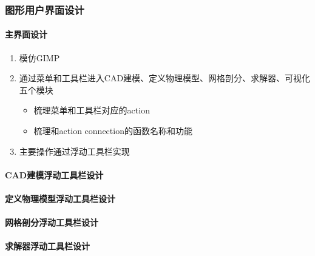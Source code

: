 \documentclass[letterpaper,10pt,english]{sphinxmanual}
\begin{document}
\subsubsection{图形用户界面设计}
\label{\detokenize{src/fengsim/airfoil:id2}}

\paragraph{主界面设计}
\label{\detokenize{src/fengsim/airfoil:id3}}\begin{enumerate}
%
\item {} 
\sphinxAtStartPar
模仿GIMP

\item {} 
\sphinxAtStartPar
通过菜单和工具栏进入CAD建模、定义物理模型、网格剖分、求解器、可视化五个模块
\begin{itemize}
\item {} 
\sphinxAtStartPar
梳理菜单和工具栏对应的action

\item {} 
\sphinxAtStartPar
梳理和action connection的函数名称和功能

\end{itemize}

\item {} 
\sphinxAtStartPar
主要操作通过浮动工具栏实现

\end{enumerate}


\paragraph{CAD建模浮动工具栏设计}
\label{\detokenize{src/fengsim/airfoil:cad}}

\paragraph{定义物理模型浮动工具栏设计}
\label{\detokenize{src/fengsim/airfoil:id4}}

\paragraph{网格剖分浮动工具栏设计}
\label{\detokenize{src/fengsim/airfoil:id5}}

\paragraph{求解器浮动工具栏设计}
\label{\detokenize{src/fengsim/airfoil:id6}}
\end{document}
